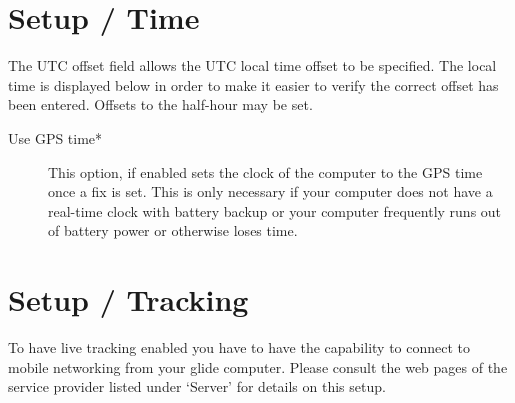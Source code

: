 \section{Setup / Time}

The UTC offset field allows the UTC local time offset to be specified.
The local time is displayed below in order to make it easier to verify
the correct offset has been entered.  Offsets to the half-hour may be
set.

\begin{description}
\item[Use GPS time*] This option, if enabled sets the clock of the computer to 
  the GPS time once a fix is set. This is only necessary if your computer does 
  not have a real-time clock with battery backup or your computer 
  frequently runs out of battery power or otherwise loses time.
\end{description}


\section{Setup / Tracking}

To have live tracking enabled you have to have the capability to connect to 
mobile networking from your glide computer.
Please consult the web pages of the service provider listed under `Server' 
for details on this setup.



